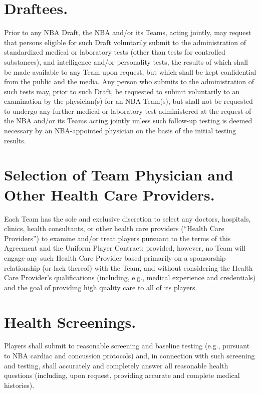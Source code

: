 \documentclass[
]{book}
\begin{document}
\hypertarget{draftees.}{%
\section{Draftees.}\label{draftees.}}

Prior to any NBA Draft, the NBA and/or its Teams, acting jointly, may request that persons eligible for such Draft voluntarily submit to the administration of standardized medical or laboratory tests (other than tests for controlled substances), and intelligence and/or personality tests, the results of which shall be made available to any Team upon request, but which shall be kept confidential from the public and the media. Any person who submits to the administration of such tests may, prior to such Draft, be requested to submit voluntarily to an examination by the physician(s) for an NBA Team(s), but shall not be requested to undergo any further medical or laboratory test administered at the request of the NBA and/or its Teams acting jointly unless such follow-up testing is deemed necessary by an NBA-appointed physician on the basis of the initial testing results.

\hypertarget{selection-of-team-physician-and-other-health-care-providers.}{%
\section{Selection of Team Physician and Other Health Care Providers.}\label{selection-of-team-physician-and-other-health-care-providers.}}

Each Team has the sole and exclusive discretion to select any doctors, hospitals, clinics, health consultants, or other health care providers (``Health Care Providers'') to examine and/or treat players pursuant to the terms of this Agreement and the Uniform Player Contract; provided, however, no Team will engage any such Health Care Provider based primarily on a sponsorship relationship (or lack thereof) with the Team, and without considering the Health Care Provider's qualifications (including, e.g., medical experience and credentials) and the goal of providing high quality care to all of its players.

\hypertarget{health-screenings.}{%
\section{Health Screenings.}\label{health-screenings.}}

Players shall submit to reasonable screening and baseline testing (e.g., pursuant to NBA cardiac and concussion protocols) and, in connection with such screening and testing, shall accurately and completely answer all reasonable health questions (including, upon request, providing accurate and complete medical histories).
\end{document}
